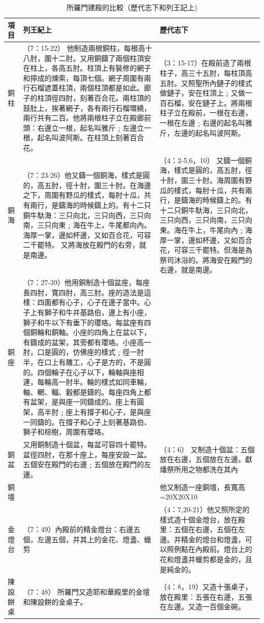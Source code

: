 \begin{table}[H]
\centering 
\begin{tabular}{|p{1cm}|p{9cm}|p{7cm}|}\hline\hline
項目 & 列王紀上 &歷代志下 \\\hline\hline
銅柱  & （7：15-22） 他制造兩根銅柱，每根高十八肘，圍十二肘。又用銅鑄了兩個柱頂安在柱上，各高五肘。柱頂上有裝修的網子和擰成的煉索，每頂七個。網子周圍有兩行石榴遮蓋柱頂，兩個柱頂都是如此。廊子的柱頂徑四肘，刻著百合花。兩柱頂的鼓肚上，挨著網子，各有兩行石榴環繞，兩行共有二百。他將兩根柱子立在殿廊前頭：右邊立一根，起名叫雅斤﹔左邊立一根，起名叫波阿斯。在柱頂上刻著百合花。& （3：15-17）在殿前造了兩根柱子，高三十五肘，每柱頂高五肘。又照聖所內鏈子的樣式做鏈子，安在柱頂上﹔又做一百石榴，安在鏈子上。將兩根柱子立在殿前，一根在右邊，一根在左邊﹔右邊的起名叫雅斤，左邊的起名叫波阿斯。 \\\hline

銅海&（7：23-26）他又鑄一個銅海，樣式是圓的，高五肘，徑十肘，圍三十肘。在海邊之下，周圍有野瓜的樣式，每肘十瓜，共有兩行，是鑄海的時候鑄上的。有十二只銅牛馱海：三只向北，三只向西，三只向南，三只向東﹔海在牛上，牛尾都向內。海厚一掌，邊如杯邊，又如百合花，可容二千罷特。 又將海放在殿門的右旁，就是南邊。& （4：2-5,6，10） 又鑄一個銅海，樣式是圓的，高五肘，徑十肘，圍三十肘。海周圍有野瓜的樣式，每肘十瓜，共有兩行，是鑄海的時候鑄上的。有十二只銅牛馱海，三只向北，三只向西，三只向南，三只向東。海在牛上，牛尾向內﹔海厚一掌，邊如杯邊，又如百合花，可容三千罷特。但海是為祭司沐浴的。將海安在殿門的右邊，就是南邊。     \\\hline

銅座& （7：27-39）他用銅制造十個盆座，每座長四肘，寬四肘，高三肘。座的造法是這樣：四面都有心子，心子在邊子當中。心子上有獅子和牛并基路伯，邊上有小座，獅子和牛以下有垂下的瓔珞。每盆座有四個銅輪和銅軸。小座的四角上在盆以下，有鑄成的盆架，其旁都有瓔珞。小座高一肘，口是圓的，仿佛座的樣式﹔徑一肘半，在口上有雕工，心子是方的，不是圓的。四個輪子在心子以下，輪軸與座相連，每輪高一肘半。輪的樣式如同車輪，軸、輞、輻、轂都是鑄的。每座四角上都有盆架，是與座一同鑄成的。座上有圓架，高半肘﹔座上有撐子和心子，是與座一同鑄的。在撐子和心子上刻著基路伯、獅子和棕樹，周圍有瓔珞。& \\\hline

銅盆& 又用銅制造十個盆，每盆可容四十罷特。盆徑四肘，在那十座上，每座安設一盆。五個安在殿門的右邊﹔五個放在殿門的左邊。& （4：6） 又制造十個盆：五個放在右邊，五個放在左邊。獻燔祭所用之物都洗在其內  \\\hline

銅壇&&他又制造一座銅壇，長寬高=20X20X10 \\\hline

金燈台& （7：49）內殿前的精金燈台：右邊五個，左邊五個，并其上的金花、燈盞、蠟剪&（4：7,20-21）他又照所定的樣式造十個金燈台，放在殿里：五個在右邊，五個在左邊。并精金的燈台和燈盞，可以照例點在內殿前。燈台上的花和燈盞并蠟剪都是金的，且是純金的。\\\hline

陳設餅桌&（7：48） 所羅門又造耶和華殿里的金壇和陳設餅的金桌子。&（4：8，19）又造十張桌子，放在殿里：五張在右邊，五張在左邊。又造一百個金碗。\\\hline
\end{tabular}
\caption{所羅門建殿的比較（歷代志下和列王記上)}
\end{table}

